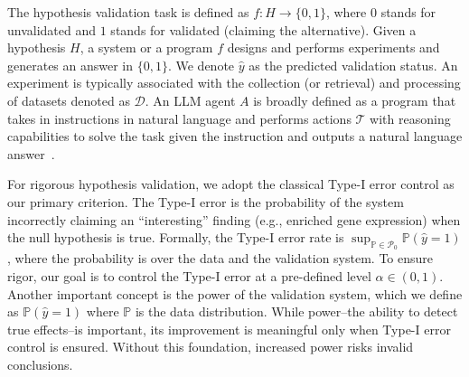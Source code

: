 The hypothesis validation task is defined as $f: H \rightarrow \{0,1\}$, where $0$ stands for unvalidated and $1$ stands for validated (claiming the alternative). Given a hypothesis $H$, a system or a program $f$ designs and performs experiments and generates an answer in $\{0,1\}$. We denote $\hat{y}$ as the predicted validation status. An experiment is typically associated with the collection (or retrieval) and processing of datasets denoted as $\mathcal{D}$.
An LLM agent $A$ is broadly defined as a program that takes in instructions in natural language and performs actions $\mathcal{T}$ with reasoning capabilities to solve the task given the instruction and outputs a natural language answer~\cite{yao2023react}. %

For rigorous hypothesis validation, we adopt the classical Type-I error control as our primary criterion. The Type-I error is the probability of the system incorrectly claiming an ``interesting'' finding (e.g., enriched gene expression) when the null hypothesis is true. 
Formally, the Type-I error rate is  $\sup_{\mathbb{P}\in \mathcal{P}_0}\mathbb{P}(\hat{y}=1)$, where the probability is over the data and the validation system. 
To ensure rigor, our goal is to control the Type-I error at a pre-defined level $\alpha \in (0,1)$.
Another important concept is the power of the validation system, which we define as $\mathbb{P}(\hat{y}=1)$ where $\mathbb{P}$ is the data distribution. 
While power--the ability to detect true effects--is important, its improvement is meaningful only when  Type-I error control is ensured. Without this foundation, increased power risks invalid conclusions. 

